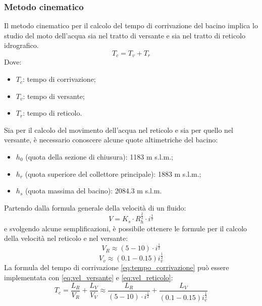 \subsubsection{Metodo cinematico}
Il metodo cinematico per il calcolo del tempo di corrivazione del bacino implica lo studio del moto dell'acqua sia nel tratto di versante e sia nel tratto di reticolo idrografico.
\begin{equation}
    T_c = T_v + T_r
    \label{eq:tempo_corrivazione}
\end{equation}
Dove:
\begin{itemize}
    \item $T_c$: tempo di corrivazione;
    \item $T_v$: tempo di versante;
    \item $T_r$: tempo di reticolo.
\end{itemize}
Sia per il calcolo del movimento dell'acqua nel reticolo e sia per quello nel versante, è necessario conoscere alcune quote altimetriche del bacino:
\begin{itemize}
    \item $h_0$ (quota della sezione di chiusura): 1183 m s.l.m.;
    \item $h_r$ (quota superiore del collettore principale): 1883 m s.l.m.;
    \item $h_s$ (quota massima del bacino): 2084.3 m s.l.m. 
\end{itemize}
Partendo dalla formula generale della velocità di un fluido: 
\begin{equation}
    V = K_s \cdot R_h^{\frac{2}{3}} \cdot i ^{\frac{1}{2}}
\end{equation}
e svolgendo alcune semplificazioni, è possibile ottenere le formule per il calcolo della velocità nel reticolo e nel versante:
\begin{equation}
    V_R \approx (5 - 10) \cdot i^{\frac{1}{2}}
    \label{eq:vel_reticolo}
\end{equation}
\begin{equation}
    V_v \approx (0.1 - 0.15) i_v^{\frac{1}{2}}
    \label{eq:vel_versante}
\end{equation}
La formula del tempo di corrivazione \eqref{eq:tempo_corrivazione} può essere implementata con \eqref{eq:vel_versante} e \eqref{eq:vel_reticolo}:
\begin{equation}
    T_c = \frac{L_R}{V_R}+ \frac{L_V}{V_V} \approx \frac{L_R}{(5 - 10) \cdot i^{\frac{1}{2}}} + \frac{L_V}{(0.1 - 0.15) i_v^{\frac{1}{2}}}
\end{equation}

